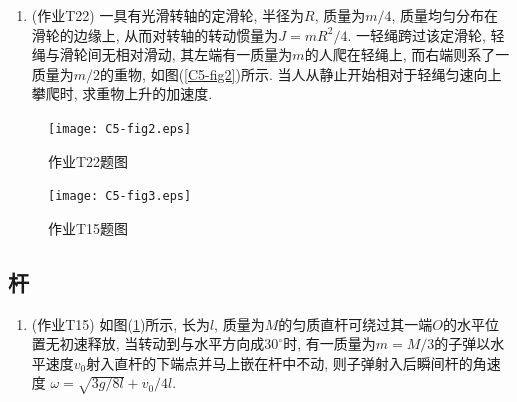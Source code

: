 \begin{enumerate}
	
	\item (作业T22) 一具有光滑转轴的定滑轮, 半径为$R$, 质量为$m/4$, 质量均匀分布在滑轮的边缘上, 从而对转轴的转动惯量为$J = mR^2/4$. 一轻绳跨过该定滑轮, 轻绳与滑轮间无相对滑动, 其左端有一质量为$m$的人爬在轻绳上, 而右端则系了一质量为$m/2$的重物, 如图(\ref{C5-fig2})所示. 当人从静止开始相对于轻绳匀速向上攀爬时, 求重物上升的加速度. 
	
\end{enumerate}

\begin{figure}[htbp]
	\centering
	\begin{minipage}[t]{0.48\textwidth}
		\centering
		\texttt{[image: C5-fig2.eps]}
		\caption{作业T22题图}
		\label{C5-fig2}
	\end{minipage}
	\begin{minipage}[t]{0.48\textwidth}
		\centering
		\texttt{[image: C5-fig3.eps]}
		\caption{作业T15题图}
		\label{C5-fig3}
	\end{minipage}
\end{figure}

\subsection{杆}

\begin{enumerate}
	
	\item (作业T15) 如图(\ref{C5-fig3})所示, 长为$l$, 质量为$M$的匀质直杆可绕过其一端$O$的水平位置无初速释放, 当转动到与水平方向成$30^{\circ}$时, 有一质量为$m = M/3$的子弹以水平速度$v_0$射入直杆的下端点并马上嵌在杆中不动, 则子弹射入后瞬间杆的角速度 \uline{$\omega = \sqrt{3g/8l} + v_0/4l$}.
	
\end{enumerate}
